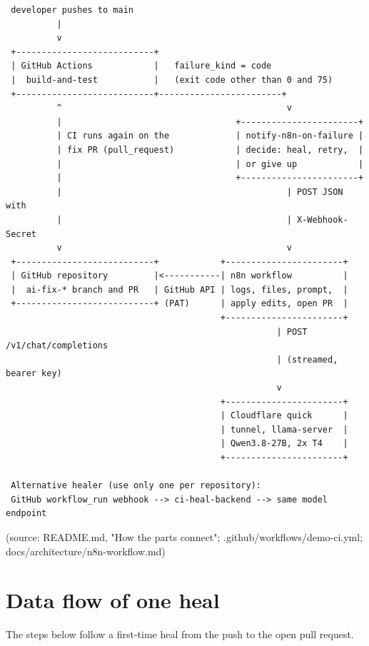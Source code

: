 \documentclass[11pt,a4paper]{report}
\begin{document}
\begin{lstlisting}
 developer pushes to main
          |
          v
 +---------------------------+
 | GitHub Actions            |   failure_kind = code
 |  build-and-test           |   (exit code other than 0 and 75)
 +---------------------------+------------------------+
          ^                                            v
          |                                  +-----------------------+
          | CI runs again on the             | notify-n8n-on-failure |
          | fix PR (pull_request)            | decide: heal, retry,  |
          |                                  | or give up            |
          |                                  +-----------------------+
          |                                            | POST JSON with
          |                                            | X-Webhook-Secret
          v                                            v
 +---------------------------+            +-----------------------+
 | GitHub repository         |<-----------| n8n workflow          |
 |  ai-fix-* branch and PR   | GitHub API | logs, files, prompt,  |
 +---------------------------+ (PAT)      | apply edits, open PR  |
                                          +-----------------------+
                                                     | POST /v1/chat/completions
                                                     | (streamed, bearer key)
                                                     v
                                          +-----------------------+
                                          | Cloudflare quick      |
                                          | tunnel, llama-server  |
                                          | Qwen3.8-27B, 2x T4    |
                                          +-----------------------+

 Alternative healer (use only one per repository):
 GitHub workflow_run webhook --> ci-heal-backend --> same model endpoint
\end{lstlisting}

(source: README.md, "How the parts connect"; .github/workflows/demo-ci.yml; docs/architecture/n8n-workflow.md)

\section{Data flow of one heal}

The steps below follow a first-time heal from the push to the open pull request.
\end{document}
